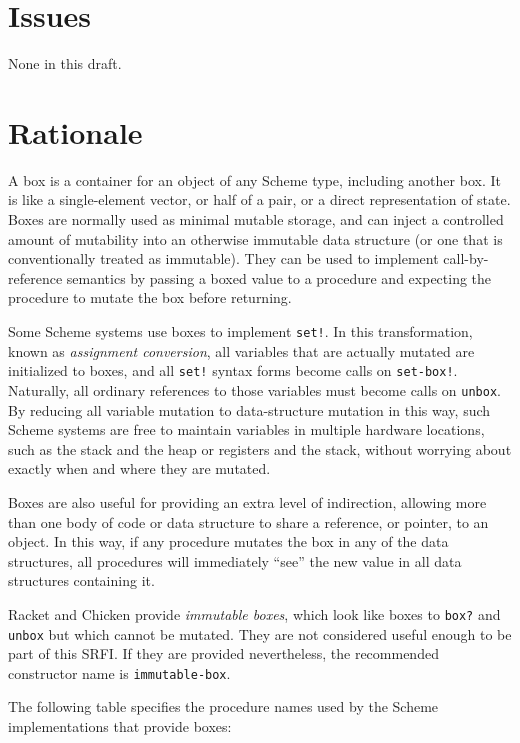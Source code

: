 \section{Issues}\label{issues}

None in this draft.

\section{Rationale}\label{rationale}

A box is a container for an object of any Scheme type, including another
box. It is like a single-element vector, or half of a pair, or a direct
representation of state. Boxes are normally used as minimal mutable
storage, and can inject a controlled amount of mutability into an
otherwise immutable data structure (or one that is conventionally
treated as immutable). They can be used to implement call-by-reference
semantics by passing a boxed value to a procedure and expecting the
procedure to mutate the box before returning.

Some Scheme systems use boxes to implement \texttt{set!}. In this
transformation, known as \emph{assignment conversion}, all variables
that are actually mutated are initialized to boxes, and all
\texttt{set!} syntax forms become calls on \texttt{set-box!}. Naturally,
all ordinary references to those variables must become calls on
\texttt{unbox}. By reducing all variable mutation to data-structure
mutation in this way, such Scheme systems are free to maintain variables
in multiple hardware locations, such as the stack and the heap or
registers and the stack, without worrying about exactly when and where
they are mutated.

Boxes are also useful for providing an extra level of indirection,
allowing more than one body of code or data structure to share a
reference, or pointer, to an object. In this way, if any procedure
mutates the box in any of the data structures, all procedures will
immediately ``see'' the new value in all data structures containing it.

Racket and Chicken provide \emph{immutable boxes}, which look like boxes
to \texttt{box?} and \texttt{unbox} but which cannot be mutated. They
are not considered useful enough to be part of this SRFI. If they are
provided nevertheless, the recommended constructor name is
\texttt{immutable-box}.

The following table specifies the procedure names used by the Scheme
implementations that provide boxes:

